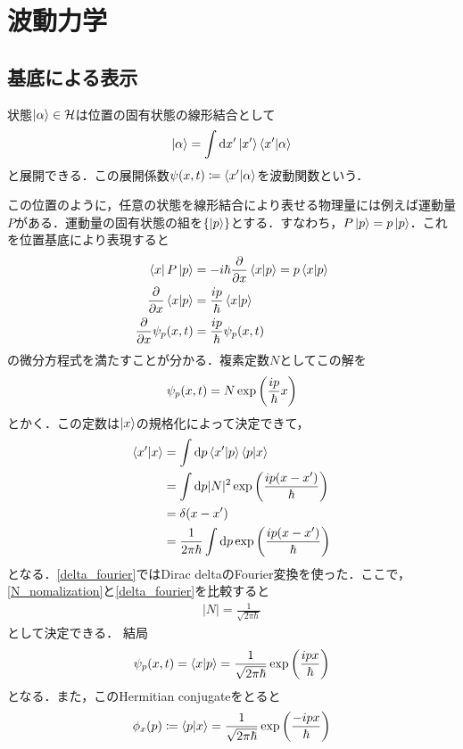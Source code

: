\section{波動力学}
\subsection{基底による表示}
状態$\ket{\alpha}\in\mathcal{H}$は位置の固有状態の線形結合として
\begin{align}
    \ket{\alpha}=\int\mathrm{d} x^{\prime}\ket{x^{\prime}}\braket{x^{\prime}}{\alpha}
\end{align}
と展開できる．この展開係数$\psi(x,t)\coloneqq\braket{x^{\prime}}{\alpha}$を波動関数という．

この位置のように，任意の状態を線形結合により表せる物理量には例えば運動量$P$がある．運動量の固有状態の組を$\qty{\ket{p}}$とする．すなわち，$P\ket{p}=p\ket{p}$．これを位置基底により表現すると
\begin{align}
    \bra{x}P\ket{p}&=-i\hbar\pdv{}{x}\braket{x}{p}=p\braket{x}{p}\\
    \pdv{}{x}\braket{x}{p}&=\frac{ip}{\hbar}\braket{x}{p}\\
    \pdv{}{x}\psi_p(x,t)&=\frac{ip}{\hbar}\psi_p(x,t)
\end{align}
の微分方程式を満たすことが分かる．複素定数$N$としてこの解を
\begin{align}
    \psi_p(x,t)=N\exp\qty(\frac{ip}{\hbar}x)
\end{align}
とかく．この定数は$\ket{x}$の規格化によって決定できて，
\begin{align}
    \braket{x^{\prime}}{x}&=\int\mathrm{d} p\braket{x^{\prime}}{p}\braket{p}{x}\\
    &=\int\mathrm{d} p |N|^{2}\exp\qty(\frac{ip\qty(x-x^{\prime})}{\hbar})\label{N_nomalization}\\
    &=\delta\qty(x-x^{\prime})\\
    &=\frac{1}{2\pi\hbar}\int\mathrm{d} p \exp\qty(\frac{ip\qty(x-x^{\prime})}{\hbar})\label{delta_fourier}
\end{align}
となる．\eqref{delta_fourier}ではDirac deltaのFourier変換を使った．ここで，\eqref{N_nomalization}と\eqref{delta_fourier}を比較すると
\begin{align}
    |N|=\frac{1}{\sqrt{2\pi\hbar}}
\end{align}
として決定できる．
結局
\begin{align}
    \psi_p(x,t)=\braket{x}{p}=\frac{1}{\sqrt{2\pi\hbar}}\exp\qty(\dfrac{ipx}{\hbar})
\end{align}
となる．また，このHermitian conjugateをとると
\begin{align}
    \phi_x(p)\coloneqq\braket{p}{x}=\frac{1}{\sqrt{2\pi\hbar}}\exp\qty(\dfrac{-ipx}{\hbar})
\end{align}

